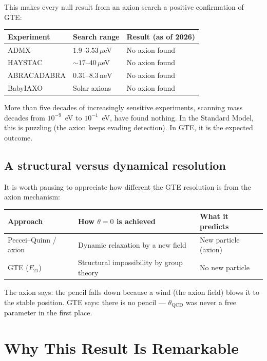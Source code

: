 \documentclass[11pt,a4paper]{article}
\begin{document}
This makes every null result from an axion search a positive confirmation of GTE:

\begin{center}
\begin{tabular}{lll}
\toprule
Experiment & Search range & Result (as of 2026) \\
\midrule
ADMX & $1.9$--$3.53\,\mu$eV & No axion found \\
HAYSTAC & $\sim\!17$--$40\,\mu$eV & No axion found \\
ABRACADABRA & $0.31$--$8.3\,\text{neV}$ & No axion found \\
BabyIAXO & Solar axions & No axion found \\
\bottomrule
\end{tabular}
\end{center}

\medskip
More than five decades of increasingly sensitive experiments, scanning mass decades from $10^{-9}$~eV to $10^{-1}$~eV, have found nothing.  In the Standard Model, this is puzzling (the axion keeps evading detection).  In GTE, it is the expected outcome.

\subsection{A structural versus dynamical resolution}

It is worth pausing to appreciate how different the GTE resolution is from the axion mechanism:

\begin{center}
\begin{tabular}{lll}
\toprule
Approach & How $\theta = 0$ is achieved & What it predicts \\
\midrule
Peccei--Quinn / axion & Dynamic relaxation by a new field & New particle (axion) \\
GTE ($F_{21}$) & Structural impossibility by group theory & No new particle \\
\bottomrule
\end{tabular}
\end{center}

\medskip
The axion says: the pencil falls down because a wind (the axion field) blows it to the stable position.  GTE says: there is no pencil --- $\theta_{\mathrm{QCD}}$ was never a free parameter in the first place.

\section{Why This Result Is Remarkable}
\end{document}
